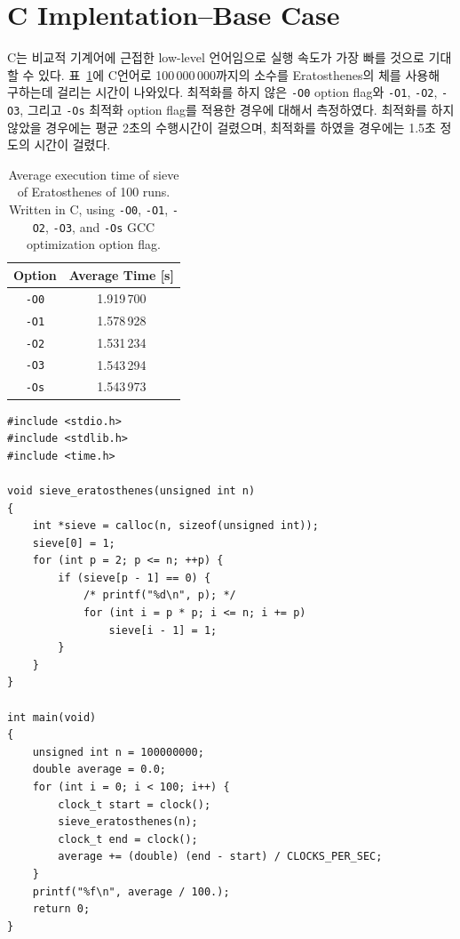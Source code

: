 \documentclass[a4paper, 10pt]{oblivoir}
\theoremstyle{definition}
\begin{document}
\section{C Implentation--Base Case}

C는 비교적 기계어에 근접한 low-level 언어임으로 실행 속도가 가장 빠를 것으로 기대할 수 있다.
표~\ref{tab:c}에 C언어로 100\,000\,000까지의 소수를 Eratosthenes의 체를 사용해 구하는데 걸리는 시간이 나와있다.
최적화를 하지 않은 \texttt{-O0} option flag와 \texttt{-O1}, \texttt{-O2}, \texttt{-O3}, 그리고 \texttt{-Os} 최적화 option flag를 적용한 경우에 대해서 측정하였다.
최적화를 하지 않았을 경우에는 평균 2초의 수행시간이 걸렸으며, 최적화를 하였을 경우에는 1.5초 정도의 시간이 걸렸다.

\begin{table}[H]
\centering
\caption{Average execution time of sieve of Eratosthenes of 100 runs. Written in C, using \texttt{-O0}, \texttt{-O1}, \texttt{-O2}, \texttt{-O3}, and \texttt{-Os} GCC optimization option flag.}
\label{tab:c}
\begin{tabular}{@{}cc@{}}
\toprule
\textbf{Option} & \textbf{Average Time [s]} \\ \midrule
\texttt{-O0}    & 1.919\,700                  \\
\texttt{-O1}    & 1.578\,928                  \\
\texttt{-O2}    & 1.531\,234                  \\
\texttt{-O3}    & 1.543\,294                  \\
\texttt{-Os}    & 1.543\,973                  \\ \bottomrule
\end{tabular}
\end{table}

\begin{verbatim}
#include <stdio.h>
#include <stdlib.h>
#include <time.h>

void sieve_eratosthenes(unsigned int n)
{
	int *sieve = calloc(n, sizeof(unsigned int));
	sieve[0] = 1;
	for (int p = 2; p <= n; ++p) {
		if (sieve[p - 1] == 0) {
			/* printf("%d\n", p); */
			for (int i = p * p; i <= n; i += p)
				sieve[i - 1] = 1;
		}
	}
}

int main(void)
{
	unsigned int n = 100000000;
	double average = 0.0;
	for (int i = 0; i < 100; i++) {
		clock_t start = clock();
		sieve_eratosthenes(n);
		clock_t end = clock();
		average += (double) (end - start) / CLOCKS_PER_SEC;
	}
	printf("%f\n", average / 100.);
	return 0;
}
\end{verbatim}
\end{document}

